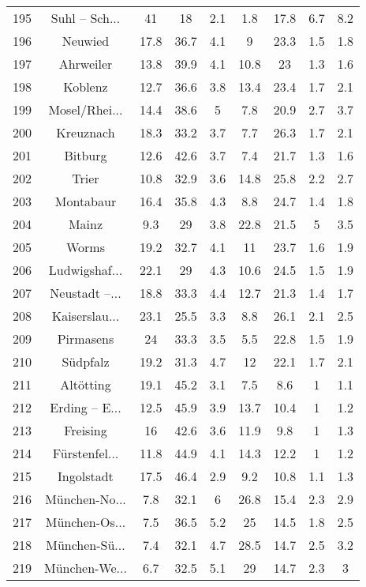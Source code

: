 \begin{table}[!htbp]
\begin{tabular}{@{\extracolsep{5pt}} ccccccccc}
195 & Suhl – Sch... & 41 & 18 & 2.1 & 1.8 & 17.8 & 6.7 & 8.2 \\ 
196 & Neuwied & 17.8 & 36.7 & 4.1 & 9 & 23.3 & 1.5 & 1.8 \\ 
197 & Ahrweiler & 13.8 & 39.9 & 4.1 & 10.8 & 23 & 1.3 & 1.6 \\ 
198 & Koblenz & 12.7 & 36.6 & 3.8 & 13.4 & 23.4 & 1.7 & 2.1 \\ 
199 & Mosel/Rhei... & 14.4 & 38.6 & 5 & 7.8 & 20.9 & 2.7 & 3.7 \\ 
200 & Kreuznach & 18.3 & 33.2 & 3.7 & 7.7 & 26.3 & 1.7 & 2.1 \\ 
201 & Bitburg & 12.6 & 42.6 & 3.7 & 7.4 & 21.7 & 1.3 & 1.6 \\ 
202 & Trier & 10.8 & 32.9 & 3.6 & 14.8 & 25.8 & 2.2 & 2.7 \\ 
203 & Montabaur & 16.4 & 35.8 & 4.3 & 8.8 & 24.7 & 1.4 & 1.8 \\ 
204 & Mainz & 9.3 & 29 & 3.8 & 22.8 & 21.5 & 5 & 3.5 \\ 
205 & Worms & 19.2 & 32.7 & 4.1 & 11 & 23.7 & 1.6 & 1.9 \\ 
206 & Ludwigshaf... & 22.1 & 29 & 4.3 & 10.6 & 24.5 & 1.5 & 1.9 \\ 
207 & Neustadt –... & 18.8 & 33.3 & 4.4 & 12.7 & 21.3 & 1.4 & 1.7 \\ 
208 & Kaiserslau... & 23.1 & 25.5 & 3.3 & 8.8 & 26.1 & 2.1 & 2.5 \\ 
209 & Pirmasens & 24 & 33.3 & 3.5 & 5.5 & 22.8 & 1.5 & 1.9 \\ 
210 & Südpfalz & 19.2 & 31.3 & 4.7 & 12 & 22.1 & 1.7 & 2.1 \\ 
211 & Altötting & 19.1 & 45.2 & 3.1 & 7.5 & 8.6 & 1 & 1.1 \\ 
212 & Erding – E... & 12.5 & 45.9 & 3.9 & 13.7 & 10.4 & 1 & 1.2 \\ 
213 & Freising & 16 & 42.6 & 3.6 & 11.9 & 9.8 & 1 & 1.3 \\ 
214 & Fürstenfel... & 11.8 & 44.9 & 4.1 & 14.3 & 12.2 & 1 & 1.2 \\ 
215 & Ingolstadt & 17.5 & 46.4 & 2.9 & 9.2 & 10.8 & 1.1 & 1.3 \\ 
216 & München-No... & 7.8 & 32.1 & 6 & 26.8 & 15.4 & 2.3 & 2.9 \\ 
217 & München-Os... & 7.5 & 36.5 & 5.2 & 25 & 14.5 & 1.8 & 2.5 \\ 
218 & München-Sü... & 7.4 & 32.1 & 4.7 & 28.5 & 14.7 & 2.5 & 3.2 \\ 
219 & München-We... & 6.7 & 32.5 & 5.1 & 29 & 14.7 & 2.3 & 3 \\ 

\end{tabular}
\end{table}
